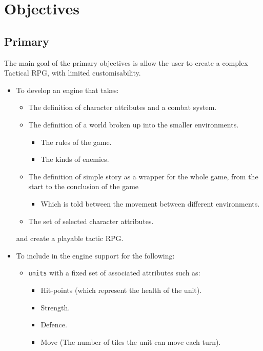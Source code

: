 \section{Objectives}
\label{Objectives}
\subsection{Primary}
\label{primary}
The main goal of the primary objectives is allow the user to create a complex Tactical RPG, with limited customisability.  
\begin{itemize}
\item To develop an engine that takes:
\begin{itemize}

 \item The definition of character attributes and a combat system.
	\item The definition of a world broken up into the smaller environments.
	\begin{itemize}
		\item The rules of the game.
		\item The kinds of enemies.
	\end{itemize}
	
	\item The definition of simple story as a wrapper for the whole game, from the start to the conclusion of the game
	\begin{itemize}
		\item Which is told between the movement between different environments.
	\end{itemize}
	                        
	\item The set of selected character attributes.
	
\end{itemize}
and create a playable tactic RPG.

\item To include in the engine support for the following:
\begin{itemize}
	\item \texttt{units} with a fixed set of associated attributes such as:
	\begin{itemize}
		\item Hit-points (which represent the health of the unit).
		\item Strength.
		\item Defence.
		\item Move (The number of tiles the unit can move each turn).
	\end{itemize}
	

\end{itemize}
\end{itemize}
